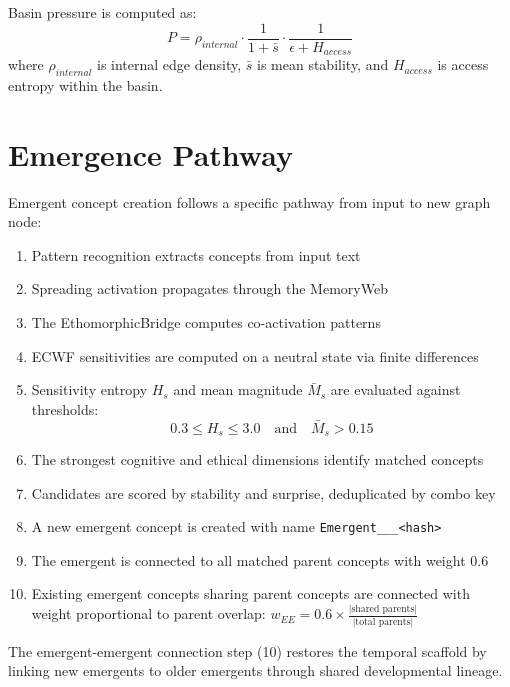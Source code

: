 \documentclass[11pt,a4paper]{article}
\begin{document}
Basin pressure is computed as:
\begin{equation}
P = \rho_{internal} \cdot \frac{1}{1 + \bar{s}} \cdot \frac{1}{\epsilon + H_{access}}
\label{eq:pressure}
\end{equation}
where $\rho_{internal}$ is internal edge density, $\bar{s}$ is mean stability, and $H_{access}$ is access entropy within the basin.

\section{Emergence Pathway}
\label{sec:emergence}

Emergent concept creation follows a specific pathway from input to new graph node:

\begin{enumerate}[nosep]
    \item Pattern recognition extracts concepts from input text
    \item Spreading activation propagates through the MemoryWeb
    \item The EthomorphicBridge computes co-activation patterns
    \item ECWF sensitivities are computed on a neutral state via finite differences
    \item Sensitivity entropy $H_s$ and mean magnitude $\bar{M}_s$ are evaluated against thresholds:
    \begin{equation}
    0.3 \leq H_s \leq 3.0 \quad \text{and} \quad \bar{M}_s > 0.15
    \label{eq:emergence_thresholds}
    \end{equation}
    \item The strongest cognitive and ethical dimensions identify matched concepts
    \item Candidates are scored by stability and surprise, deduplicated by combo key
    \item A new emergent concept is created with name \texttt{Emergent\_<parent1>\_<parent2>\_<hash>}
    \item The emergent is connected to all matched parent concepts with weight 0.6
    \item Existing emergent concepts sharing parent concepts are connected with weight proportional to parent overlap: $w_{EE} = 0.6 \times \frac{|\text{shared parents}|}{|\text{total parents}|}$
\end{enumerate}

The emergent-emergent connection step (10) restores the temporal scaffold by linking new emergents to older emergents through shared developmental lineage.
\end{document}
